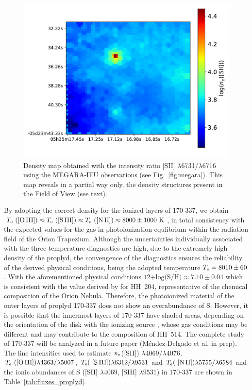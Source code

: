 \documentclass[fleqn,usenatbib]{mnras}
\begin{document}
\begin{figure}
\includegraphics[width=\columnwidth]{density_map.pdf}
\caption{Density map obtained with the intensity ratio [S\thinspace II] $\lambda$6731/$\lambda$6716 using the MEGARA-IFU observations (see Fig.~\ref{fig:megara}). This map reveals in a partial way only, the density structures present in the Field of View (see text).}
\label{fig:density_map}
\end{figure}


By adopting the correct density for the ionized layers of 170-337, we obtain $T_{\rm e} \text{ ([O\thinspace III])} \approx T_{\rm e} \text{ ([S\thinspace III])} \approx T_{\rm e} \text{ ([N\thinspace II])} \approx 8000 \pm 1000 \text{ K}$, in total consistency with the expected values for the gas in photoionization equlibrium within the radiation field of the Orion Trapezium. Although the uncertainties individually associated with the three temperature diagnostics are high, due to the extremely high density of the proplyd, the convengence of the diagnostics ensures the reliability of the derived physical conditions, being the adopted temperature $T_{\rm e}=8010 \pm 60$. With the aforementioned physical conditions $\text{12+log(S/H)} \approx 7.10 \pm 0.04 $ which is consistent with the value derived by \citet{mendez2021-2} for HH~204, representative of the chemical composition of the Orion Nebula. Therefore, the photoionized material of the outer layers of proplyd 170-337 does not show an overabundance of S. However, it is possible that the innermost layers of 170-337 have shaded areas, depending on the orientation of the disk with the ionizing source \citep[see Fig.~5 from][]{henney99}, whose gas conditions may be different and may contribute to the composition of HH~514. The complete study of 170-337 will be analyzed in a future paper (M\'endez-Delgado et al. in prep). The line intensities used to estimate $n_{\rm e}$([S\thinspace II]) $\lambda$4069/$\lambda$4076, $T_{\rm e} \text{ ([O\thinspace III])} \lambda4363/\lambda5007$, $T_{\rm e} (\text{ [S\thinspace III])} \lambda6312/\lambda9531$ and $T_{\rm e} (\text{ [N\thinspace II])} \lambda5755/\lambda6584$  
and the ionic abundances of S ([S\thinspace II] $\lambda 4069$, [S\thinspace III] $\lambda 9531$) in 170-337 are shown in Table~\ref{tab:fluxes_proplyd}. 
\end{document}
